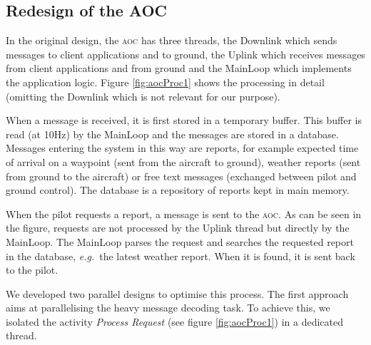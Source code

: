 \documentclass{sig-alternate}
\newcommand{\acronym}[1]{\textsc{#1}}
\newcommand{\eg}{\textit{e.g.}}
\begin{document}

\subsection{Redesign of the AOC}\label{sub:redesign}
In the original design, 
the \acronym{aoc} has three threads,
the Downlink which sends messages 
to client applications and to ground,
the Uplink which receives messages 
from client applications and from ground and
the MainLoop which implements the application logic. 
Figure \ref{fig:aocProc1} shows the processing in detail
(omitting the Downlink which is not relevant for our purpose).


When a message is received, 
it is first stored in a temporary buffer.
This buffer is read (at 10Hz) by the MainLoop
and the messages are stored in a database.
Messages entering the system in this way are reports,
for example expected time of arrival on a waypoint
(sent from the aircraft to ground), 
weather reports (sent from ground to the aircraft)
or free text messages (exchanged between pilot and ground control).
The database is a repository of reports
kept in main memory.

When the pilot requests a report,
a message is sent to the \acronym{aoc}.
As can be seen in the figure, 
requests are not processed by the Uplink thread
but directly by the MainLoop.
The MainLoop parses the request
and searches the requested report in the database,
\eg\ the latest weather report.
When it is found, it is sent back to the pilot.

We developed two parallel designs to optimise this process.
The first approach aims at
parallelising the heavy message decoding task.
To achieve this, we isolated the activity 
\emph{Process Request} (see figure \ref{fig:aocProc1})
in a dedicated thread.
\end{document}
